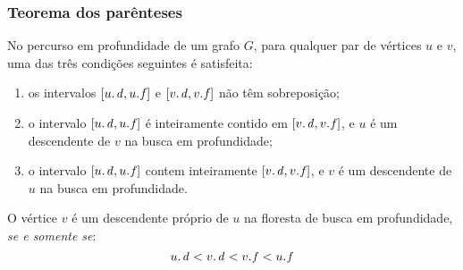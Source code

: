\documentclass{beamer}
\begin{document}
\begin{frame}
\frametitle{Teorema dos parênteses}

\begin{theorem}
No percurso em profundidade de um grafo $G$, para qualquer par de vértices $u$ e $v$, uma
das três condições seguintes é satisfeita:
\begin{enumerate}
\item os intervalos $[\attrib{u}{d}, \attrib{u}{f}]$ e $[\attrib{v}{d}, \attrib{v}{f}]$ não têm sobreposição;
\item o intervalo $[\attrib{u}{d}, \attrib{u}{f}]$ é inteiramente contido em $[\attrib{v}{d}, \attrib{v}{f}]$, e $u$ é um descendente de $v$ na busca em profundidade;
\item o intervalo $[\attrib{u}{d}, \attrib{u}{f}]$ contem inteiramente $[\attrib{v}{d}, \attrib{v}{f}]$, e $v$ é um descendente de $u$ na busca em profundidade.
\end{enumerate}
\end{theorem}

\begin{corollary}
O vértice $v$ é um descendente próprio de $u$ na floresta de busca em profundidade, \emph{se e somente se}:
$$\attrib{u}{d} < \attrib{v}{d} < \attrib{v}{f} < \attrib{u}{f}$$
\end{corollary}

\end{frame}
\end{document}
